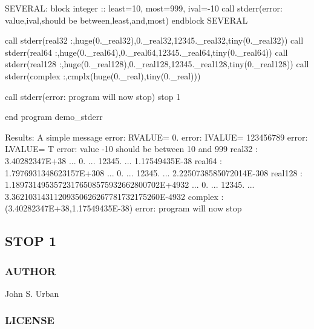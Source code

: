 S\+E\+V\+E\+R\+AL\+: block integer \+:\+: least=10, most=999, ival=-\/10 call stderr(\textquotesingle{}error\+: value\textquotesingle{},ival,\textquotesingle{}should be between\textquotesingle{},least,\textquotesingle{}and\textquotesingle{},most) endblock S\+E\+V\+E\+R\+AL

call stderr(\textquotesingle{}real32 \+:\textquotesingle{},huge(0.\+\_\+real32),0.\+\_\+real32,12345.\+\_\+real32,tiny(0.\+\_\+real32)) call stderr(\textquotesingle{}real64 \+:\textquotesingle{},huge(0.\+\_\+real64),0.\+\_\+real64,12345.\+\_\+real64,tiny(0.\+\_\+real64)) call stderr(\textquotesingle{}real128 \+:\textquotesingle{},huge(0.\+\_\+real128),0.\+\_\+real128,12345.\+\_\+real128,tiny(0.\+\_\+real128)) call stderr(\textquotesingle{}complex \+:\textquotesingle{},cmplx(huge(0.\+\_\+real),tiny(0.\+\_\+real)))

call stderr(\textquotesingle{}error\+: program will now stop\textquotesingle{}) stop 1

end program demo\+\_\+stderr

Results\+: A simple message error\+: R\+V\+A\+L\+UE= 0. error\+: I\+V\+A\+L\+UE= 123456789 error\+: L\+V\+A\+L\+UE= T error\+: value -\/10 should be between 10 and 999 real32 \+: 3.\+40282347E+38 ... 0. ... 12345. ... 1.\+17549435E-\/38 real64 \+: 1.\+7976931348623157E+308 ... 0. ... 12345. ... 2.\+2250738585072014E-\/308 real128 \+: 1.\+18973149535723176508575932662800702E+4932 ... 0. ... 12345. ... 3.\+36210314311209350626267781732175260E-\/4932 complex \+: (3.\+40282347E+38,1.\+17549435E-\/38) error\+: program will now stop \subsection*{S\+T\+OP 1 }

\subsubsection*{A\+U\+T\+H\+OR}

John S. Urban \subsubsection*{L\+I\+C\+E\+N\+SE}

